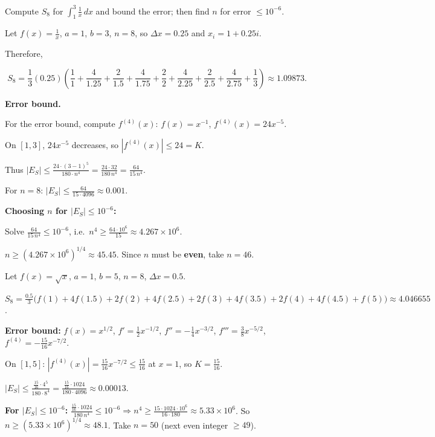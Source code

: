 \begin{examplebox}[title={Worked Example (Lecture Example 3.25): Error control for Simpson's Rule}]

Compute $S_8$ for $\int_1^3\frac{1}{x}\,dx$ and bound the error; then find $n$ for error $\le 10^{-6}$.

Let $f(x)=\frac1x$, $a=1$, $b=3$, $n=8$, so $\Delta x=0.25$ and $x_i=1+0.25i$.

Therefore,

\[
S_8=\frac{1}{3}(0.25)\left(\frac{1}{1}+\frac{4}{1.25}+\frac{2}{1.5}+\frac{4}{1.75}+\frac{2}{2}+\frac{4}{2.25}+\frac{2}{2.5}+\frac{4}{2.75}+\frac{1}{3}\right)
\approx 1.09873.
\]

\textbf{Error bound.}

For the error bound, compute $f^{(4)}(x)$: $f(x)=x^{-1}$, $f^{(4)}(x)=24x^{-5}$.

On $[1,3]$, $24x^{-5}$ decreases, so $|f^{(4)}(x)| \le 24 = K$.

Thus $|E_S| \le \frac{24\cdot(3-1)^5}{180\cdot n^4}=\frac{24\cdot 32}{180\,n^4}=\frac{64}{15\,n^4}$.

For $n=8$: $|E_S|\le \frac{64}{15\cdot 4096}\approx 0.001$.

\textbf{Choosing $n$ for $|E_S|\le 10^{-6}$:}

Solve $\frac{64}{15\,n^4}\le 10^{-6}$, i.e.\ $n^4\ge\frac{64\cdot 10^6}{15}\approx 4.267\times 10^6$.

$n\ge (4.267\times 10^6)^{1/4}\approx 45.45$. Since $n$ must be \textbf{even}, take $n=46$.

\end{examplebox}

\begin{examplebox}[title={Worked Example (Tutorial 6, Q3): $S_8$ for $\int_1^5\sqrt{x}\,dx$ and error control}]

Let $f(x)=\sqrt{x}$, $a=1$, $b=5$, $n=8$, $\Delta x=0.5$.

$S_8 = \frac{0.5}{3}\bigl(f(1)+4f(1.5)+2f(2)+4f(2.5)+2f(3)+4f(3.5)+2f(4)+4f(4.5)+f(5)\bigr)\approx 4.046655$.

\textbf{Error bound:}
$f(x)=x^{1/2}$, $f'=\frac12 x^{-1/2}$, $f''=-\frac14 x^{-3/2}$, $f'''=\frac38 x^{-5/2}$, $f^{(4)}=-\frac{15}{16}x^{-7/2}$.

On $[1,5]$: $|f^{(4)}(x)|=\frac{15}{16}x^{-7/2}\le \frac{15}{16}$ at $x=1$, so $K=\frac{15}{16}$.

$|E_S|\le \frac{\frac{15}{16}\cdot 4^5}{180\cdot 8^4}=\frac{\frac{15}{16}\cdot 1024}{180\cdot 4096}\approx 0.00013$.

\textbf{For $|E_S|\le 10^{-6}$:} $\frac{\frac{15}{16}\cdot 1024}{180\,n^4}\le 10^{-6}\Rightarrow n^4\ge \frac{15\cdot 1024\cdot 10^6}{16\cdot 180}\approx 5.33\times 10^6$. So $n\ge (5.33\times 10^6)^{1/4}\approx 48.1$. Take $n=50$ (next even integer $\ge 49$).

\end{examplebox}

